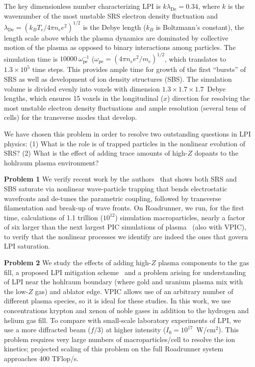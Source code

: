 \documentclass[10pt]{article}
\newcommand{\lde}      {\lambda_{\mathrm{De}}}
\newcommand{\wpe}      {\omega_{\mathrm{pe}}}
\begin{document}
The key dimensionless number characterizing LPI is $k \lde = 0.34$,
where $k$ is the wavenumber of the most unstable SRS electron density
fluctuation and $\lde = (k_B T_e / 4 \pi n_e e^2)^{1/2}$ is the Debye
length ($k_B$ is Boltzmann's constant), the length scale above which
the plasma dynamics are dominated by collective motion of the plasma
as opposed to binary interactions among particles.  The simulation
time is $10000~\wpe^{-1}$ ($\wpe = (4 \pi n_e e^2 / m_e)^{1/2}$, which
translates to $1.3 \times 10^5$ time steps.  This provides ample time
for growth of the first ``bursts'' of SRS as well as development of
ion density structures (SBS).  The simulation volume is divided evenly
into voxels with dimension $1.3 \times 1.7 \times 1.7$~Debye lengths,
which ensures 15 voxels in the longitudinal ($x$) direction for
resolving the most unstable electron density fluctuations and ample
resolution (several tens of cells) for the transverse modes that
develop.

We have chosen this problem in order to resolve two outstanding
questions in LPI physics: (1) What is the role is of trapped particles
in the nonlinear evolution of SRS?  (2) What is the effect of adding
trace amounts of high-$Z$ dopants to the hohlraum plasma environment?

\textbf{Problem 1}
We verify recent work by the authors~\cite{} that shows both SRS and
SBS saturate via nonlinear wave-particle trapping that bends
electrostatic wavefronts and de-tunes the parametric coupling,
followed by transverse filamentation and break-up of wave fronts.  On
Roadrunner, we run, for the first time, calculations of 1.1 trillion
($10^{12}$) simulation macroparticles, nearly a factor of six larger
than the next largest PIC simulations of plasma~\cite{} (also with
VPIC), to verify that the nonlinear processes we identify are indeed
the ones that govern LPI saturation.

\textbf{Problem 2}
We study the effects of adding high-$Z$ plasma components to the gas
fill, a proposed LPI mitigation scheme~\cite{} and a problem arising
for understanding of LPI near the hohlraum boundary (where gold and
uranium plasma mix with the low-$Z$ gas) and ablator edge.  VPIC
allows use of an arbitrary number of different plasma species, so it
is ideal for these studies.  In this work, we use concentrations
krypton and xenon of noble gases in addition to the hydrogen and
helium gas fill.  To compare with small-scale laboratory experiments
of LPI, we use a more diffracted beam ($f/3$) at higher intensity
($I_0 = 10^{17}$~W/cm$^2$). This problem requires very large numbers
of macroparticles/cell to resolve the ion kinetics; projected scaling
of this problem on the full Roadrunner system approaches 400 TFlop/s.
\end{document}
